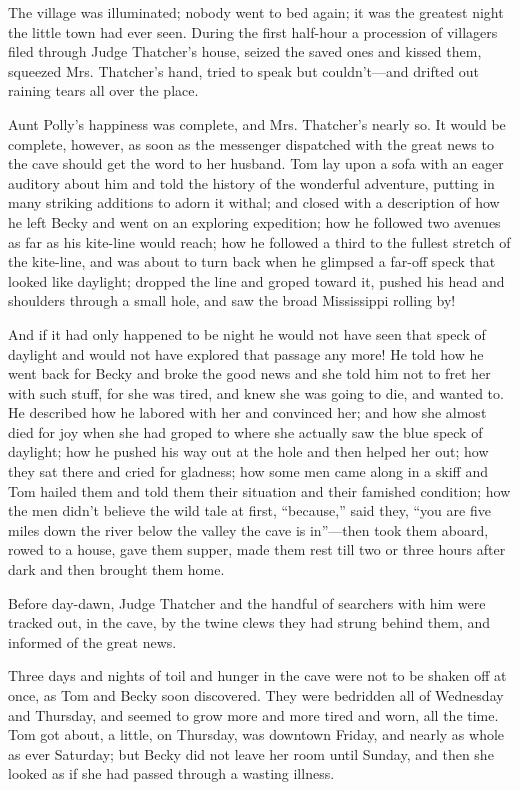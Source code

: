 \documentclass{book}
\begin{document}
The village was illuminated; nobody went to bed again; it was the greatest night the little town had ever seen. During the first half-hour a procession of villagers filed through Judge Thatcher’s house, seized the saved ones and kissed them, squeezed Mrs. Thatcher’s hand, tried to speak but couldn’t—and drifted out raining tears all over the place.

Aunt Polly’s happiness was complete, and Mrs. Thatcher’s nearly so. It would be complete, however, as soon as the messenger dispatched with the great news to the cave should get the word to her husband. Tom lay upon a sofa with an eager auditory about him and told the history of the wonderful adventure, putting in many striking additions to adorn it withal; and closed with a description of how he left Becky and went on an exploring expedition; how he followed two avenues as far as his kite-line would reach; how he followed a third to the fullest stretch of the kite-line, and was about to turn back when he glimpsed a far-off speck that looked like daylight; dropped the line and groped toward it, pushed his head and shoulders through a small hole, and saw the broad Mississippi rolling by!

And if it had only happened to be night he would not have seen that speck of daylight and would not have explored that passage any more! He told how he went back for Becky and broke the good news and she told him not to fret her with such stuff, for she was tired, and knew she was going to die, and wanted to. He described how he labored with her and convinced her; and how she almost died for joy when she had groped to where she actually saw the blue speck of daylight; how he pushed his way out at the hole and then helped her out; how they sat there and cried for gladness; how some men came along in a skiff and Tom hailed them and told them their situation and their famished condition; how the men didn’t believe the wild tale at first, “because,” said they, “you are five miles down the river below the valley the cave is in”—then took them aboard, rowed to a house, gave them supper, made them rest till two or three hours after dark and then brought them home.

Before day-dawn, Judge Thatcher and the handful of searchers with him were tracked out, in the cave, by the twine clews they had strung behind them, and informed of the great news.

Three days and nights of toil and hunger in the cave were not to be shaken off at once, as Tom and Becky soon discovered. They were bedridden all of Wednesday and Thursday, and seemed to grow more and more tired and worn, all the time. Tom got about, a little, on Thursday, was downtown Friday, and nearly as whole as ever Saturday; but Becky did not leave her room until Sunday, and then she looked as if she had passed through a wasting illness.
\end{document}
